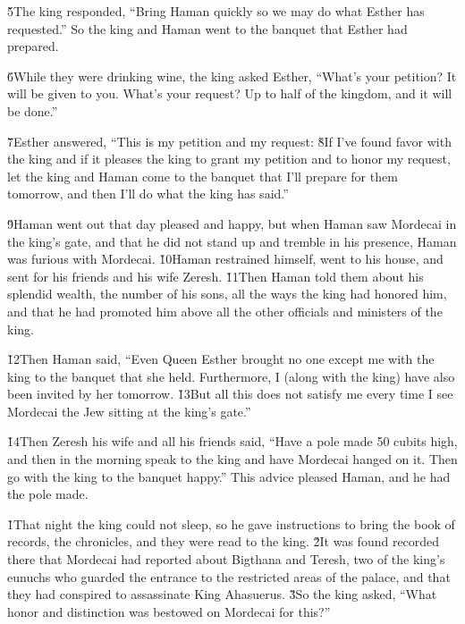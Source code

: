 \v{5}The king responded, ``Bring Haman quickly so we may do what Esther has requested.'' So the king and Haman went to the banquet that Esther had prepared.

\v{6}While they were drinking wine, the king asked Esther, ``What's your petition? It will be given to you. What's your request? Up to half of the kingdom, and it will be done.''

\v{7}Esther answered, ``This is my petition and my request: \v{8}If I've found favor with the king and if it pleases the king to grant my petition and to honor my request, let the king and Haman come to the banquet that I'll prepare for them tomorrow, and then I'll do what the king has said.''

\v{9}Haman went out that day pleased and happy, but when Haman saw Mordecai in the king's gate, and that he did not stand up and tremble in his presence, Haman was furious with Mordecai. \v{10}Haman restrained himself, went to his house, and sent for his friends and his wife Zeresh. \v{11}Then Haman told them about his splendid wealth, the number of his sons, all the ways the king had honored him, and that he had promoted him above all the other officials and ministers of the king.

\v{12}Then Haman said, ``Even Queen Esther brought no one except me with the king to the banquet that she held. Furthermore, I (along with the king) have also been invited by her tomorrow. \v{13}But all this does not satisfy me every time I see Mordecai the Jew sitting at the king's gate.''

\v{14}Then Zeresh his wife and all his friends said, ``Have a pole made 50 cubits high, and then in the morning speak to the king and have Mordecai hanged on it. Then go with the king to the banquet happy.'' This advice pleased Haman, and he had the pole made.

\v{1}That night the king could not sleep, so he gave instructions to bring the book of records, the chronicles, and they were read to the king. \v{2}It was found recorded there that Mordecai had reported about Bigthana and Teresh, two of the king's eunuchs who guarded the entrance to the restricted areas of the palace, and that they had conspired to assassinate King Ahasuerus. \v{3}So the king asked, ``What honor and distinction was bestowed on Mordecai for this?''

